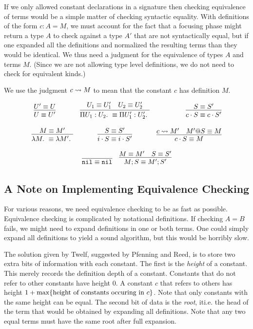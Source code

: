 If we only allowed constant declarations in a signature then checking equivalence
of terms would be a simple matter of checking syntactic equality.  
With definitions of the form $c : A = M$, we must account
for the fact that a focusing phase might return a type $A$ to 
check against a type $A'$ that are not syntactically equal, but
if one expanded all the definitions and normalized the resulting
terms than they would be identical.  We thus need a judgment for the
equivalence of types $A$ and terms $M$.  (Since we are not allowing
type level definitions, we do not need to check for equivalent kinds.)

We use the judgment $c\rightsquigarrow M$  to mean
that the constant $c$ has definition $M$. 

\bigskip 
{}
\bigskip 

$$
\begin{array}{lcr}\
\infer{\Equiv{U}{U'}}{\Equiv{U'}{U}} &  
\infer{\Equiv{\PiTyp{U_1}{U_2}}{\PiTyp{U_1'}{U_2'}}}{\Equiv{U_1}{U_1'} & \Equiv{U_2}{U_2'}} & 
\infer{\Equiv{c\cdot S}{c\cdot S'}}{\Equiv{S}{S'}} \\\\
\infer{\Equiv{\Lam{M}}{\Lam{M'}}}{\Equiv{M}{M'}} &
\infer{\Equiv{i\cdot S}{i\cdot S'}}{\Equiv{S}{S'}} &
\infer{\Equiv{c\cdot S}{M}}{c\StepsTo M' & \Equiv{M'@S}{M}} 
\end{array} 
$$

\bigskip 
{}
\bigskip 

$$
\begin{array}{lcr}
\infer{\Equiv{\Nil}{\Nil}}{} &
\infer{\Equiv{M;S}{M';S'}}{\Equiv{M}{M'} & \Equiv{S}{S'}}
\end{array} 
$$

\subsection{A Note on Implementing Equivalence Checking}

  For various reasons, we need equivalence checking to
be as fast as possible.  Equivalence checking is complicated
by notational definitions.  If checking $A=B$ fails, we might need
to expand definitions in one or both terms.  One could simply
expand all definitions to yield a sound algorithm, but this would
be horribly slow.  

  The solution given by Twelf, suggested by 
Pfenning and Reed, is to store two extra bits of information 
with each constant.  The first is the \emph{height} of a constant.
This merely records the definition depth of a constant.  Constants that
do not refer to other constants have height 0.  A constant $c$ that refers
to others has height $1 + \max\{\mbox{height of constants occuring in } c\}$.
Note that only constants with the same height can be equal.  
The second bit of data is the \emph{root}, it{i.e.} the head of the term that would be obtained by 
expanding all definitions.  Note that any two equal terms must have the
same root after full expansion. 

